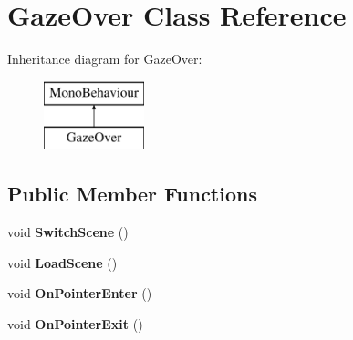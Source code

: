 \hypertarget{class_gaze_over}{}\section{Gaze\+Over Class Reference}
\label{class_gaze_over}
Inheritance diagram for Gaze\+Over\+:\begin{figure}[H]
\begin{center}
\leavevmode
\includegraphics[height=2.000000cm]{class_gaze_over}
\end{center}
\end{figure}
\subsection*{Public Member Functions}
\begin{DoxyCompactItemize}
\item 
void {\bfseries Switch\+Scene} ()\hypertarget{class_gaze_over_a3bb891d7e1c1baf91593d2d975c98ef1}{}\label{class_gaze_over_a3bb891d7e1c1baf91593d2d975c98ef1}

\item 
void {\bfseries Load\+Scene} ()\hypertarget{class_gaze_over_a81b841907b39b75f68a04fef02a5923d}{}\label{class_gaze_over_a81b841907b39b75f68a04fef02a5923d}

\item 
void {\bfseries On\+Pointer\+Enter} ()\hypertarget{class_gaze_over_a8542b157da5e6c98d4500fa96b34e169}{}\label{class_gaze_over_a8542b157da5e6c98d4500fa96b34e169}

\item 
void {\bfseries On\+Pointer\+Exit} ()\hypertarget{class_gaze_over_ac6babe5ebb9a2fe681d559ab64b4f4ad}{}\label{class_gaze_over_ac6babe5ebb9a2fe681d559ab64b4f4ad}

\end{DoxyCompactItemize}
